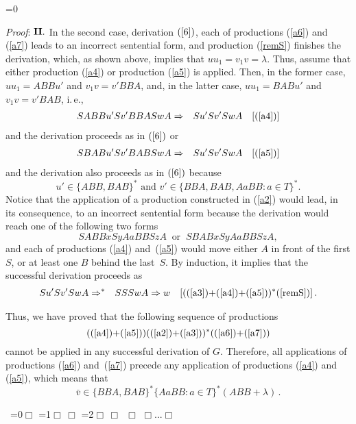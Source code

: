 \documentclass[copyright]{eptcs}
\makeatletter
\newcounter{d@proof}\let\thed@proof\relax\setcounter{d@proof}{0}
\newcommand*{\qed}{$\Box$}
\newenvironment{proof}{\ifnum \value{d@proof}=0{\setcounter{claim}{0}}\else\fi
  \stepcounter{d@proof}\par\noindent
  {\rmfamily\itshape\mdseries Proof\/}:\hspace{\labelsep}\ignorespaces}{\addtocounter{d@proof}{-1}\mbox{}\nolinebreak\hfill~\ifnum \value{d@proof}=0{\qed}\else
    \ifnum \value{d@proof}=1{\qed\nolinebreak\,\nolinebreak\qed}\else
      \ifnum \value{d@proof}=2{\qed\nolinebreak\,\nolinebreak\qed
          \nolinebreak\,\nolinebreak\qed}\else
        {\qed\nolinebreak...\nolinebreak\qed}\fi\fi\fi
  \medbreak
}
\newcommand{\Ra}{\Rightarrow}
\newcommand{\eps}{\lambda}
\makeatother
\begin{document}
\begin{proof}
    ${\bf II.}$ In the second case, derivation $(\ref{6})$, each of productions (\ref{a6}) 
    and (\ref{a7}) leads to an incorrect sentential form, and production (\ref{remS}) 
    finishes the derivation, which, as shown above, implies that \hbox{$uu_1=v_1v=\eps$}. Thus, 
    assume that either production (\ref{a4}) or production (\ref{a5}) is applied. Then, in 
    the former case,\linebreak
    $uu_1=ABBu'$ and $v_1v=v'BBA$, and, in the latter case, $uu_1=BABu'$ and $v_1v=v'BAB$, i.\,e.,
    \begin{eqnarray}\label{9}
      SABBu'Sv'BBASwA & \Ra & Su'Sv'SwA \quad [\textrm{(\ref{a4})}]
    \end{eqnarray}
    and the derivation proceeds as in $(\ref{6})$ or
    \begin{eqnarray}\label{10}
      SBABu'Sv'BABSwA & \Ra & Su'Sv'SwA \quad [\textrm{(\ref{a5})}]
    \end{eqnarray}
    and the derivation also proceeds as in $(\ref{6})$ because 
    $$u'\in\{ABB,BAB\}^* \mbox{ and } v'\in\{BBA,BAB,AaBB : a\in T\}^*.$$
    Notice that the application of a production 
    constructed in (\ref{a2}) would lead, in its consequence, to an incorrect sentential 
    form because the derivation would reach one of the following two forms 
    $$SABBxSyAaBBSzA \ \mbox{ or }\ SBABxSyAaBBSzA,$$
    and each of productions (\ref{a4}) and~(\ref{a5}) would move 
    either $A$ in front of the first $S$, or at least one $B$ behind the last~$S$.  
    By induction, it implies that the successful derivation proceeds as
    \begin{eqnarray}
      Su'Sv'SwA & \Ra^* & SSSwA \Ra w \quad [\textrm{((\ref{a3})+(\ref{a4})+(\ref{a5}))$^*$(\ref{remS})}]\,.
    \end{eqnarray}

    Thus, we have proved that the following sequence of productions \[\textrm{((\ref{a4})+(\ref{a5}))((\ref{a2})+(\ref{a3}))$^*$((\ref{a6})+(\ref{a7}))}\] cannot be applied in any successful derivation of $G$. Therefore, all applications of productions (\ref{a6}) 
    and~(\ref{a7}) precede any application of productions (\ref{a4}) and (\ref{a5}), which means that \[\bar{v}\in\{BBA,BAB\}^*\{AaBB : a\in T\}^*(ABB+\eps)\,.\]


\end{proof}
\end{document}

